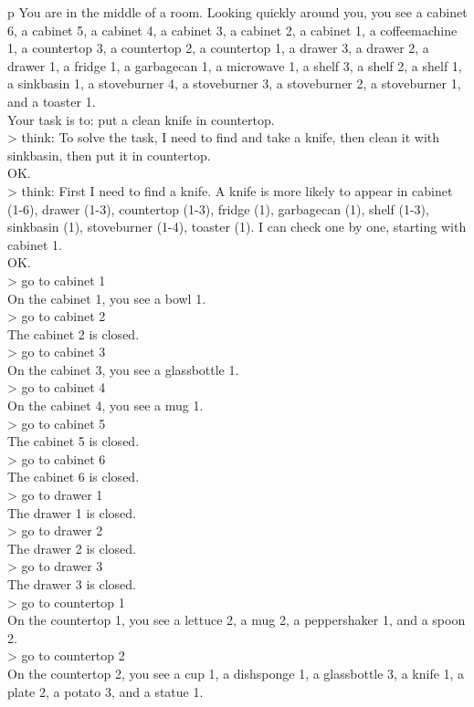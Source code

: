 \begin{table}[H]
\begin{minipage}{0.9\linewidth}
\begin{tabular}{p\linewidth}
You are in the middle of a room. Looking quickly around you, you see a cabinet 6, a cabinet 5, a cabinet 4, a cabinet 3, a cabinet 2, a cabinet 1, a coffeemachine 1, a countertop 3, a countertop 2, a countertop 1, a drawer 3, a drawer 2, a drawer 1, a fridge 1, a garbagecan 1, a microwave 1, a shelf 3, a shelf 2, a shelf 1, a sinkbasin 1, a stoveburner 4, a stoveburner 3, a stoveburner 2, a stoveburner 1, and a toaster 1. \\
Your task is to: put a clean knife in countertop. \\
> think: To solve the task, I need to find and take a knife, then clean it with sinkbasin, then put it in countertop. \\
OK. \\
> think: First I need to find a knife. A knife is more likely to appear in cabinet (1-6), drawer (1-3), countertop (1-3), fridge (1), garbagecan (1), shelf (1-3), sinkbasin (1), stoveburner (1-4), toaster (1). I can check one by one, starting with cabinet 1. \\
OK. \\
> go to cabinet 1 \\
On the cabinet 1, you see a bowl 1. \\
> go to cabinet 2 \\
The cabinet 2 is closed. \\
> go to cabinet 3 \\
On the cabinet 3, you see a glassbottle 1. \\
> go to cabinet 4 \\
On the cabinet 4, you see a mug 1. \\
> go to cabinet 5 \\
The cabinet 5 is closed. \\
> go to cabinet 6 \\
The cabinet 6 is closed. \\
> go to drawer 1 \\
The drawer 1 is closed. \\
> go to drawer 2 \\
The drawer 2 is closed. \\
> go to drawer 3 \\
The drawer 3 is closed. \\
> go to countertop 1 \\
On the countertop 1, you see a lettuce 2, a mug 2, a peppershaker 1, and a spoon 2. \\
> go to countertop 2 \\
On the countertop 2, you see a cup 1, a dishsponge 1, a glassbottle 3, a knife 1, a plate 2, a potato 3, and a statue 1. \\

\end{tabular}
\end{minipage}
\end{table}
